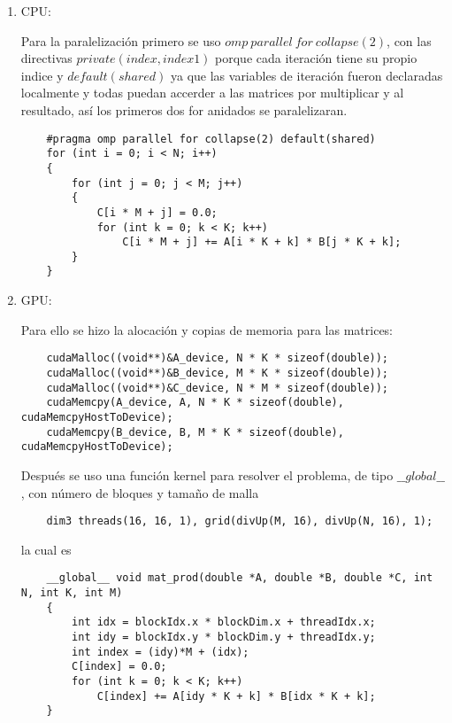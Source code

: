 \documentclass[letterpaper]{article}
\theoremstyle{definition}
\theoremstyle{lemathm}
\theoremstyle{lemathm}
\theoremstyle{lemathm}
\theoremstyle{lemademthm}
\newcommand{\1}{\mathbbm{1}}
\begin{document}
	\begin{enumerate}
		\item CPU:

		Para la paralelización primero se uso $omp\ parallel\ for\ collapse(2)$, con las directivas $private(index, index1)$ porque cada iteración tiene su propio indice y $default(shared)$ ya que las variables de iteración fueron declaradas localmente y todas puedan accerder a las matrices por multiplicar y al resultado, así los primeros dos for anidados se paralelizaran.

		\begin{verbatim}
	#pragma omp parallel for collapse(2) default(shared)
    for (int i = 0; i < N; i++)
    {
        for (int j = 0; j < M; j++)
        {
            C[i * M + j] = 0.0;
            for (int k = 0; k < K; k++)
                C[i * M + j] += A[i * K + k] * B[j * K + k];
        }
    }
		\end{verbatim}

		\item GPU:
		
		Para ello se hizo la alocación y copias de memoria para las matrices:

		\begin{verbatim}
	cudaMalloc((void**)&A_device, N * K * sizeof(double));
	cudaMalloc((void**)&B_device, M * K * sizeof(double));
	cudaMalloc((void**)&C_device, N * M * sizeof(double));
	cudaMemcpy(A_device, A, N * K * sizeof(double), cudaMemcpyHostToDevice);
	cudaMemcpy(B_device, B, M * K * sizeof(double), cudaMemcpyHostToDevice);
		\end{verbatim}

		Después se uso una función kernel para resolver el problema, de tipo $\_\_global\_\_$, con número de bloques y tamaño de malla

		\begin{verbatim}
	dim3 threads(16, 16, 1), grid(divUp(M, 16), divUp(N, 16), 1);
		\end{verbatim}
		
		la cual es

		\begin{verbatim}
	__global__ void mat_prod(double *A, double *B, double *C, int N, int K, int M)
	{
		int idx = blockIdx.x * blockDim.x + threadIdx.x;
		int idy = blockIdx.y * blockDim.y + threadIdx.y;
		int index = (idy)*M + (idx);
		C[index] = 0.0;
		for (int k = 0; k < K; k++)
			C[index] += A[idy * K + k] * B[idx * K + k];
	}
		\end{verbatim}
	\end{enumerate}
\end{document}
